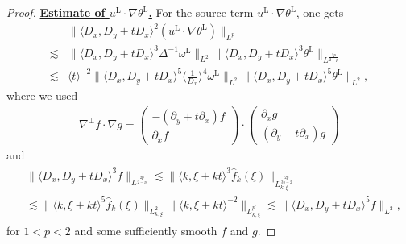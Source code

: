 \documentclass[reqno, 12pt]{amsart} %
\theoremstyle{plain} %
\theoremstyle{definition}
\theoremstyle{remark}
\numberwithin{equation}{section} %
\newcommand{\px}{\partial_x}
\newcommand{\py}{\partial_y}
\begin{document}
\begin{proof}
		
		\underline{\bf Estimate of $u^{\mathrm{L}} \cdot \nabla \theta^{\mathrm{L}}$.}
		For the source term $u^{\mathrm{L}} \cdot \nabla \theta^{\mathrm{L}}$, one gets
		$$
		\begin{aligned}
			& \|\langle D_x, D_y+t D_x\rangle^2\left(u^{\mathrm{L}} \cdot \nabla \theta^{\mathrm{L}}\right)\|_{L^p} \\
			\lesssim &  \|\langle D_x, D_y+t D_x\rangle^3 \Delta^{-1} \omega^{\mathrm{L}}\|_{L^2}\|\langle D_x, D_y+t D_x\rangle^3 \theta^{\mathrm{L}}\|_{L^{\frac{2 p}{2-p}}} \\
			\lesssim & \langle t\rangle^{-2} \|\langle D_x, D_y+t D_x\rangle^5\langle\frac{1}{D_x}\rangle^4 \omega^{\mathrm{L}}\|_{L^2}\|\langle D_x, D_y+t D_x\rangle^5 \theta^{\mathrm{L}}\|_{L^2},
		\end{aligned}
		$$
		where we used
		\begin{align} \label{eq:trick0}
			\nabla^\perp f \cdot \nabla g = \left(\begin{array}{c}
				-(\py + t\px)f \\
				\px f
			\end{array}\right) \cdot \left(\begin{array}{c}
				\px g \\
				(\py + t\px) g
			\end{array}\right)
		\end{align}
		and
		\begin{align} \label{eq:trick}
			\begin{aligned}
				& \|\langle D_x, D_y+t D_x\rangle^3 f\|_{L^{\frac{2 p}{2-p}}} \lesssim\|\langle k, \xi+k t\rangle^3 \hat{f}_k(\xi)\|_{L_{k, \xi}^{\frac{2 p}{3 p-2}}} \\
				& \lesssim  \|\langle k, \xi+k t\rangle^5 \hat{f}_k(\xi)\|_{L_{k, \xi}^2}\|\langle k, \xi+k t\rangle^{-2}\|_{L_{k, \xi}^{p^{\prime}}} \lesssim\|\langle D_x, D_y+t D_x\rangle^5 f\|_{L^2},
			\end{aligned}
		\end{align}
		for $1<p<2$ and some sufficiently smooth $f$ and $g$.
		

\end{proof}
\end{document}
